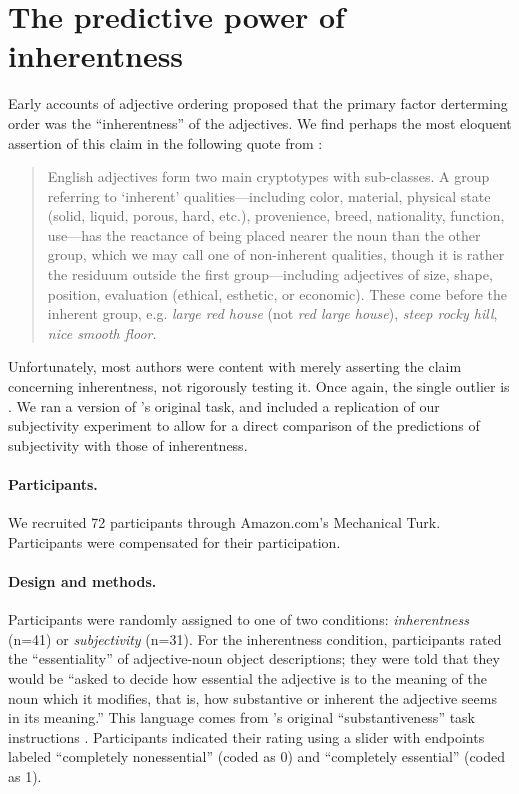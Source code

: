 \documentclass[12pt]{article}
\begin{document}
\section{The predictive power of inherentness}

Early accounts of adjective ordering proposed that the primary factor derterming order was the ``inherentness'' of the adjectives. We find perhaps the most eloquent assertion of this claim in the following quote from \cite[p.~5]{whorf1945}: 

\begin{quotation}
English adjectives form two main cryptotypes with sub-classes. A group referring to `inherent' qualities---including color, material, physical state (solid, liquid, porous, hard, etc.), provenience, breed, nationality, function, use---has the reactance of being placed nearer the noun than the other group, which we may call one of non-inherent qualities, though it is rather the residuum outside the first group---including adjectives of size, shape, position, evaluation (ethical, esthetic, or economic). These come before the inherent group, e.g. \emph{large red house} (not \emph{red large house}), \emph{steep rocky hill}, \emph{nice smooth floor}.
\end{quotation}

Unfortunately, most authors were content with merely asserting the claim concerning inherentness, not rigorously testing it. Once again, the single outlier is \cite{martin1969}. We ran a version of \citeauthor{martin1969}'s original task, and included a replication of our subjectivity experiment to allow for a direct comparison of the predictions of subjectivity with those of inherentness.

\paragraph{Participants.} We recruited 72 participants through Amazon.com's Mechanical Turk. Participants were compensated for their participation.

\paragraph{Design and methods.} Participants were randomly assigned to one of two conditions: \emph{inherentness} (n=41) or \emph{subjectivity} (n=31). For the inherentness condition, participants rated the ``essentiality'' of adjective-noun object descriptions; they were told that they would be ``asked to decide how essential the adjective is to the meaning of the noun which it modifies, that is, how substantive or inherent the adjective seems in its meaning.'' This language comes from \citeauthor{martin1969}'s original ``substantiveness'' task instructions \citep[Expt.~VII]{martin1969}. Participants indicated their rating using a slider with endpoints labeled ``completely nonessential'' (coded as 0) and ``completely essential'' (coded as 1).
\end{document}
